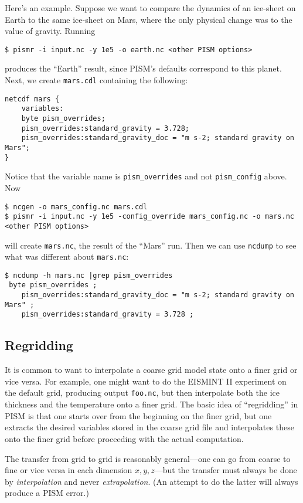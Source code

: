 Here's an example.  Suppose we want to compare the dynamics of an ice-sheet on Earth to the same ice-sheet on Mars, where the only physical change was to the value of gravity.  Running
\begin{verbatim}
$ pismr -i input.nc -y 1e5 -o earth.nc <other PISM options>
\end{verbatim}
produces the ``Earth'' result, since PISM's defaults correspond to this planet.  Next, we create \texttt{mars.cdl} containing the following:
\small
\begin{verbatim}
netcdf mars {
    variables:
    byte pism_overrides;
    pism_overrides:standard_gravity = 3.728;
    pism_overrides:standard_gravity_doc = "m s-2; standard gravity on Mars";
}
\end{verbatim}
\normalsize
Notice that the variable name is \texttt{pism_overrides} and not \texttt{pism_config} above. Now
\small
\begin{verbatim}
$ ncgen -o mars_config.nc mars.cdl
$ pismr -i input.nc -y 1e5 -config_override mars_config.nc -o mars.nc <other PISM options>
\end{verbatim}
\normalsize
will create \texttt{mars.nc}, the result of the ``Mars'' run.  Then we can use \texttt{ncdump} to see what was different about \texttt{mars.nc}:
\small
\begin{verbatim}
$ ncdump -h mars.nc |grep pism_overrides
 byte pism_overrides ;
    pism_overrides:standard_gravity_doc = "m s-2; standard gravity on Mars" ;
    pism_overrides:standard_gravity = 3.728 ;
\end{verbatim}
\normalsize

\subsection{Regridding}
\label{sec:regridding}

It is common to want to interpolate a coarse grid model state onto a finer grid or vice versa.  For example, one might want to do the EISMINT II experiment on the default grid, producing output \texttt{foo.nc}, but then interpolate both the ice thickness and the temperature onto a finer grid.  The basic idea of ``regridding'' in PISM is that one starts over from the beginning on the finer grid, but one extracts the desired variables stored in the coarse grid file and interpolates these onto the finer grid before proceeding with the actual computation.

The transfer from grid to grid is reasonably general---one can go from coarse to fine or vice versa in each dimension $x,y,z$---but the transfer must always be done by \emph{interpolation} and never \emph{extrapolation}.  (An attempt to do the latter will always produce a PISM error.)

